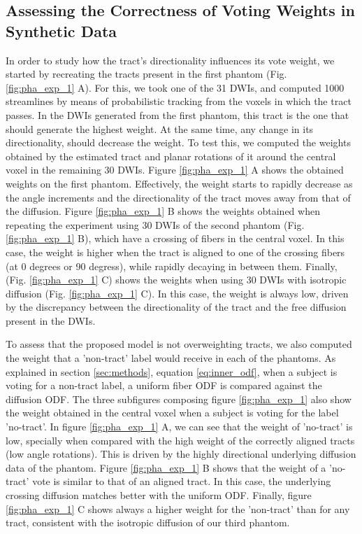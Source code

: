 \subsection{Assessing the Correctness of Voting Weights in Synthetic Data}
In order to study how the tract's directionality influences its vote weight,
we started by recreating the tracts present in the first phantom (Fig. \ref{fig:pha_exp_1} A).
For this, we took one of the 31 DWIs, and computed 1000 streamlines by means of 
probabilistic tracking from the voxels in which the tract passes. In the DWIs
generated from the first phantom, this tract is the one that should generate the
highest weight. At the same time, any change in its directionality, should decrease
the weight. To test this, we computed the weights obtained by the estimated tract
and planar rotations of it around the central voxel in the remaining 30 DWIs.
Figure \ref{fig:pha_exp_1} A shows the obtained weights on the first phantom.
Effectively, the weight starts to rapidly decrease as the angle increments and 
the directionality of the tract moves away from that of the diffusion.
Figure \ref{fig:pha_exp_1} B shows the weights obtained when repeating the 
experiment using 30 DWIs of the second phantom (Fig. \ref{fig:pha_exp_1} B),
which have a crossing of fibers in the central voxel. In this case, the weight
is higher when the tract is aligned to one of the crossing fibers (at 0 degrees
or 90 degress), while rapidly decaying in between them. Finally,
(Fig. \ref{fig:pha_exp_1} C) shows the weights when using 30 DWIs with
isotropic diffusion (Fig. \ref{fig:pha_exp_1} C). In this case, the weight
is always low, driven by the discrepancy between the directionality of the tract
and the free diffusion present in the DWIs.

To assess that the proposed model is not overweighting tracts, we also computed
the weight that a 'non-tract' label would receive in each of the phantoms. As
explained in section \ref{sec:methods}, equation \ref{eq:inner_odf}, when a
subject is voting for a non-tract label, a uniform fiber ODF is compared against
the diffusion ODF. The three subfigures composing figure \ref{fig:pha_exp_1}
also show the weight obtained in the central voxel when a subject is voting for
the label 'no-tract'. In figure \ref{fig:pha_exp_1} A, we can see that the
weight of 'no-tract' is low, specially when compared with the high weight
of the correctly aligned tracts (low angle rotations). This is driven by the
highly directional underlying diffusion data of the phantom. 
Figure \ref{fig:pha_exp_1} B shows that the weight of a 'no-tract' vote is
similar to that of an aligned tract. In this case, the underlying crossing
diffusion matches better with the uniform ODF. Finally, figure \ref{fig:pha_exp_1} C
shows always a higher weight for the 'non-tract' than for any tract, consistent
with the isotropic diffusion of our third phantom.

